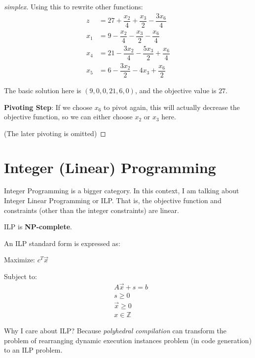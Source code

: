 \begin{proof}[simplex]
    Using this to rewrite other functions:
    \begin{align}
        z &= 27 + \dfrac{x_2}{4} + \dfrac{x_3}{2} - \dfrac{3x_6}{4} \\
        x_1 &= 9 - \dfrac{x_2}{4} - \dfrac{x_3}{2} - \dfrac{x_6}{4}  \\
        x_4 &= 21 - \dfrac{3 x_2}{4} - \dfrac{5 x_3}{2} + \dfrac{x_6}{4}  \\
        x_5 &= 6 - \dfrac{3 x_2}{2} - 4 x_3 + \dfrac{x_6}{2} 
    \end{align}

    The basic solution here is \((9, 0, 0, 21, 6, 0)\), and the objective value is \(27\). 

    \textbf{Pivoting Step}: If we choose \(x_6\) to pivot again, this will actually decrease the objective function, so we can either choose \(x_2\) or \(x_3\) here.   

    (The later pivoting is omitted)
\end{proof}

\section{Integer (Linear) Programming}

Integer Programming is a bigger category. 
In this context, I am talking about Integer Linear Programming or ILP. 
That is, the objective function and constraints (other than the integer constraints) are linear.

ILP is \textbf{NP-complete}.  

\begin{definition}[ILP]
    An ILP standard form is expressed as:

    Maximize: \(c^T \vec{x} \) 

    Subject to:
    \begin{align}
        &A \vec{x} + s = b \\
        &s \geq 0 \\
        &\vec{x} \geq 0 \\
        & x \in \mathbb{Z} 
    \end{align}
\end{definition}

\begin{note}
    Why I care about ILP? 
    Because \textit{polyhedral compilation} can transform the problem of rearranging dynamic execution instances problem (in code generation) to an ILP problem.
\end{note}